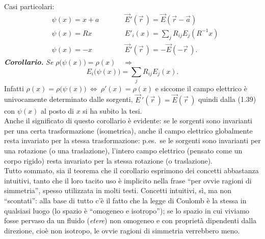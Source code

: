 Casi particolari:
\begin{equation}
\begin{aligned}
&\psi(x)=x+a&\qquad&\vec E'(\vec r\,)=\vec E(\vec r-\vec a)\\
&\psi(x)=Rx&&E'_i(x)=\textstyle\sum_jR_{ij}E_j(R^{-1}x)\\
&\psi(x)=-x&&\vec E'(\vec r\,)=-\vec E(-\vec r\,).
\end{aligned}
\tag{1.41}
\end{equation}
\textbf{\textit{Corollario.}} \textit{Se} $\rho\big(\psi(x)\big)=\rho(x)\quad\Rightarrow$
\begin{equation}
E_i\big(\psi(x)\big)=\textstyle\sum_jR_{ij}E_j(x).
\tag{1.42}
\end{equation}
Infatti $\rho(x)=\rho\big(\psi(x)\big)\ \Leftrightarrow\ \rho'(x)=\rho(x)$ e siccome il campo elettrico è univocamente determinato dalle sorgenti, $\vec E\,'(\vec r\,)=\vec E(\vec r\,)$ quindi dalla (1.39) con $\psi(x)$ al posto di $x$ si ha subito la tesi.\\
Anche il significato di questo corollario è evidente: se le sorgenti sono invarianti per una
certa trasformazione (isometrica), anche il campo elettrico globalmente resta invariato per la stessa trasformazione: p.es.\ se le sorgenti sono invarianti per una rotazione (o una traslazione), l'intero campo elettrico (pensato come un corpo rigido) resta invariato per la stessa rotazione (o traslazione).\\
Tutto sommato, sia il teorema che il corollario esprimono dei concetti abbastanza intuitivi, tanto che il loro tacito uso è implicito nella frase ``per ovvie ragioni di simmetria'', spesso utilizzata in molti testi. Concetti intuitivi, sì, ma non ``scontati'': alla base di tutto c'è il fatto che la legge di Coulomb è la stessa in qualsiasi luogo (lo spazio è ``omogeneo e isotropo''); se lo spazio in cui viviamo fosse pervaso da un fluido (\emph{etere}) non omogeneo e con proprietà dipendenti dalla direzione, cioè non isotropo, le ovvie ragioni di simmetria verrebbero meno.


